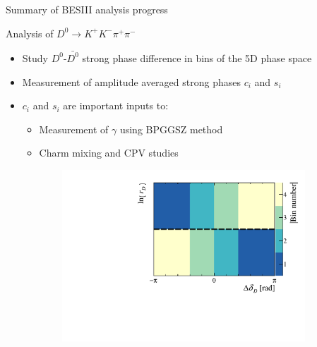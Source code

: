 \documentclass{beamer}
\begin{document}
\begin{frame}{Summary of BESIII analysis progress}
  \begin{center}
    \Large{Analysis of $D^0\to K^+K^-\pi^+\pi^-$}
  \end{center}
  \vspace{0.5cm}
  \begin{itemize}
    \setlength\itemsep{1.0em}
    \item{Study $D^0$-$\bar{D^0}$ strong phase difference in bins of the 5D phase space}
    \item{Measurement of amplitude averaged strong phases $c_i$ and $s_i$}
    \item{$c_i$ and $s_i$ are important inputs to:}
    \begin{itemize}
      \item{Measurement of $\gamma$ using BPGGSZ method}
      \item{Charm mixing and CPV studies}
    \end{itemize}
  \end{itemize}
  \begin{figure}
    \centering
    \begin{subfigure}{0.37\textwidth}
      \includegraphics[width = 1.0\textwidth]{Plots/BinningSchemePlot_4Bins.pdf}
    \end{subfigure}%
    \hspace{1cm}
    \begin{subfigure}{0.30\textwidth}

\end{subfigure}
\end{figure}
\end{frame}
\end{document}
